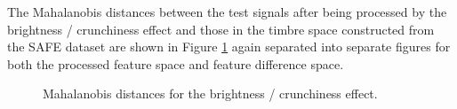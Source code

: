 			The Mahalanobis distances between the test signals after being processed by the brightness /
			crunchiness effect and those in the timbre space constructed from the SAFE dataset are shown in
			Figure \ref{fig:CrunchJeffs} again separated into separate figures for both the processed feature
			space and feature difference space.

			\begin{figure}[h!]
				\centering
				\quad
				\caption{Mahalanobis distances for the brightness / crunchiness effect.}
				\label{fig:CrunchJeffs}
			\end{figure}

